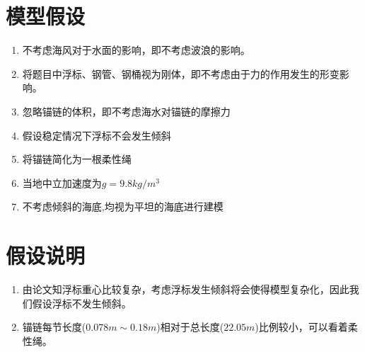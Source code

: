 \documentclass{cumcm}
\begin{document}
\section{模型假设}
\begin{enumerate}
	\item 不考虑海风对于水面的影响，即不考虑波浪的影响。
	\item 将题目中浮标、钢管、钢桶视为刚体，即不考虑由于力的作用发生的形变影响。
	\item 忽略锚链的体积，即不考虑海水对锚链的摩擦力
	\item 假设稳定情况下浮标不会发生倾斜
	\item 将锚链简化为一根柔性绳
	\item 当地中立加速度为$g=9.8kg/m^3$
	\item 不考虑倾斜的海底,均视为平坦的海底进行建模
\end{enumerate}
\section{假设说明}
\begin{enumerate}
	\item 由论文\cite{floatmodel}知浮标重心比较复杂，考虑浮标发生倾斜将会使得模型复杂化，因此我们假设浮标不发生倾斜。
	\item 锚链每节长度($0.078m\sim 0.18m$)相对于总长度($22.05m$)比例较小，可以看着柔性绳。
	
\end{enumerate}
\end{document}
